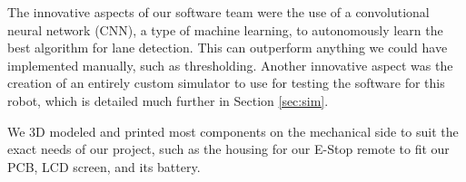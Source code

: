 The innovative aspects of our software team were the use of a convolutional neural network (CNN), a type of machine learning, to autonomously learn the best algorithm for lane detection. This can outperform anything we could have implemented manually, such as thresholding. Another innovative aspect was the creation of an entirely custom simulator to use for testing the software for this robot, which is detailed much further in Section \ref{sec:sim}. 

We 3D modeled and printed most components on the mechanical side to suit the exact needs of our project, such as the housing for our E-Stop remote to fit our PCB, LCD screen, and its battery.